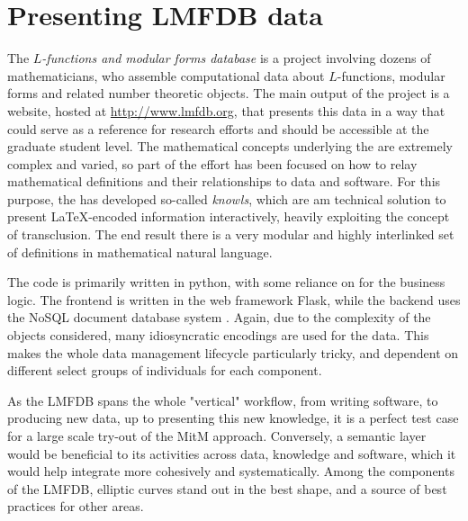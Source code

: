 \section{Presenting LMFDB data}
The \emph{$L$-functions and modular forms database} is a project involving dozens of
mathematicians, who assemble computational data about $L$-functions, modular forms and
related number theoretic objects. The main output of the project is a website, hosted at
\url{http://www.lmfdb.org}, that presents this data in a way that could serve as a
reference for research efforts and should be accessible at the graduate student level.
The mathematical concepts underlying the \LMFDB are extremely complex and varied, so part
of the effort has been focused on how to relay mathematical definitions and their
relationships to data and software. For this purpose, the \LMFDB has developed so-called
\emph{knowls}, which are am technical solution to present \LaTeX-encoded information
interactively, heavily exploiting the concept of transclusion. The end result there is a
very modular and highly interlinked set of definitions in mathematical natural language.
 
The \LMFDB code is primarily written in \textsf{python}, with some reliance on \Sage for
the business logic. The frontend is written in the web framework Flask, while the backend
uses the NoSQL document database system \Mongo \cite{lmfdb-repo}. Again, due to the
complexity of the objects considered, many idiosyncratic encodings are used for the
data. This makes the whole data management lifecycle particularly tricky, and dependent on
different select groups of individuals for each component.

As the LMFDB spans the whole "vertical" workflow, from writing software, to producing new
data, up to presenting this new knowledge, it is a perfect test case for a large scale
try-out of the MitM approach. Conversely, a semantic layer would be beneficial to its
activities across data, knowledge and software, which it would help integrate more
cohesively and systematically. Among the components of the LMFDB, elliptic curves stand
out in the best shape, and a source of best practices for other areas. 

